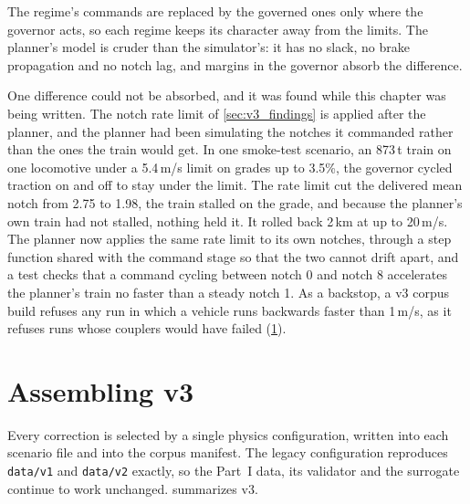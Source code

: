 The regime's commands are replaced by the governed ones only where the governor acts, so each regime keeps its character away from the limits. The planner's model is cruder than the simulator's: it has no slack, no brake propagation and no notch lag, and margins in the governor absorb the difference.

One difference could not be absorbed, and it was found while this chapter was being written. The notch rate limit of \cref{sec:v3_findings} is applied after the planner, and the planner had been simulating the notches it commanded rather than the ones the train would get. In one smoke-test scenario, an 873\,t train on one locomotive under a 5.4\,m/s limit on grades up to 3.5\%, the governor cycled traction on and off to stay under the limit. The rate limit cut the delivered mean notch from 2.75 to 1.98, the train stalled on the grade, and because the planner's own train had not stalled, nothing held it. It rolled back 2\,km at up to 20\,m/s. The planner now applies the same rate limit to its own notches, through a step function shared with the command stage so that the two cannot drift apart, and a test checks that a command cycling between notch 0 and notch 8 accelerates the planner's train no faster than a steady notch 1. As a backstop, a v3 corpus build refuses any run in which a vehicle runs backwards faster than 1\,m/s, as it refuses runs whose couplers would have failed (\cref{sec:v3_assembly}).

\section{Assembling v3}
\label{sec:v3_assembly}

Every correction is selected by a single physics configuration, written into each scenario file and into the corpus manifest. The legacy configuration reproduces \texttt{data/v1} and \texttt{data/v2} exactly, so the Part~I data, its validator and the surrogate continue to work unchanged.  summarizes v3.

